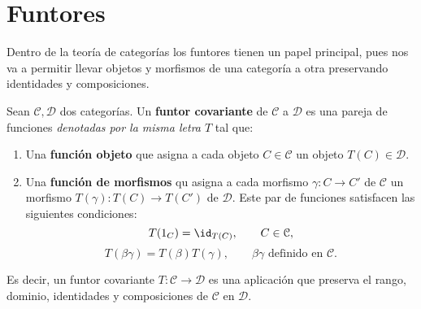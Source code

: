 \section{Funtores}

Dentro de la teoría de categorías los funtores tienen un papel principal, pues nos va a permitir llevar objetos y morfismos de una categoría a otra preservando identidades y composiciones.

\begin{definicion}
	Sean $\mathcal{C}, \mathcal{D}$ dos categorías. Un \textbf{funtor covariante} de $\mathcal{C}$ a $\mathcal{D}$ es una pareja de funciones \textit{denotadas por la misma letra $T$} tal que:
	\begin{enumerate}
		\item Una \textbf{función objeto} que asigna a cada objeto $C \in \mathcal{C}$ un objeto $T(C) \in \mathcal{D}$.
		\item Una \textbf{función de morfismos} qu asigna a cada morfismo $\gamma: C \rightarrow C'$ de $\mathcal{C}$ un morfismo $T(\gamma): T(C) \rightarrow T(C')$ de $\mathcal{D}$. Este par de funciones satisfacen las siguientes condiciones:
		\begin{equation}
			T(1_C) = \id_{T(C)}, \qquad C \in \mathcal{C},
		\end{equation}
		\begin{equation}
			T(\beta \gamma) = T(\beta)T(\gamma), \qquad \beta \gamma \text{ definido en } \mathcal{C}.
		\end{equation}
	\end{enumerate}
\end{definicion}

Es decir, un funtor covariante $T: \mathcal{C} \rightarrow \mathcal{D}$ es una aplicación que preserva el rango, dominio, identidades y composiciones de $\mathcal{C}$ en $\mathcal{D}$.

\endinput
